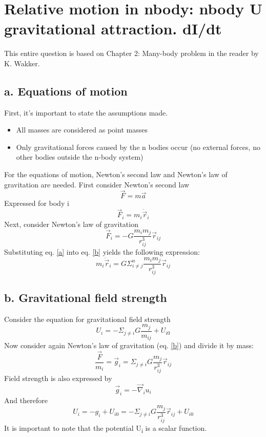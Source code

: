 \section{ Relative motion in nbody: nbody U gravitational attraction. dI/dt  }\label{sec:q1}
This entire question is based on Chapter 2: Many-body problem in the reader by K. Wakker.    

\subsection{a. Equations of motion}

First, it's important to state the assumptions made.
\begin{itemize}
\item All masses are considered as point masses
\item Only gravitational forces caused by the n bodies occur (no external forces, no other bodies outside the n-body system)
\end{itemize}
For the equations of motion, Newton's second law and Newton's law of gravitation are needed. First consider Newton's second law
\begin{equation}
\vec{F} = m \vec{a}
\end{equation}
Expressed for body i
\begin{equation}
\vec{F}_i = m_i \ddot{\vec{r}}_i
\label{a}
\end{equation}
Next, consider Newton's law of gravitation
\begin{equation}
\vec{F}_i = -G\frac{m_i m_j}{r_{ij}^3}\vec{r}_{ij}
\label{b}
\end{equation}
Substituting eq. \ref{a} into eq. \ref{b} yields the following expression:
\begin{equation}
m_i \ddot{\vec{r}}_i = G\Sigma_{i \neq j}^n \frac{m_i m_j}{r_{ij}^3}\vec{r}_{ij}
\end{equation}
\subsection{b. Gravitational field strength}
Consider the equation for gravitational field strength
\begin{equation}
U_i = -\Sigma_{j \neq i} G \frac{m_j}{m_{ij}} + U_{i0}
\end{equation}
Now consider again Newton's law of gravitation (eq. \ref{b}) and divide it by mass:
\begin{equation}
\frac{\vec{F}}{m_i} = \vec{g}_i = \Sigma_{j \neq i} G \frac{m_j}{r_{ij}^3}\vec{r}_{ij}
\end{equation}
Field strength is also expressed by
\begin{equation}
\vec{g}_i = - \vec{\nabla}_i u_i
\end{equation}
And therefore 
\begin{equation}
U_i = -g_i + U_{i0} = -\Sigma_{j \neq i} G \frac{m_j}{r_{ij}^3}\vec{r}_{ij} + U_{i0}
\end{equation}
It is important to note that the potential U\textsubscript i is a scalar function.
